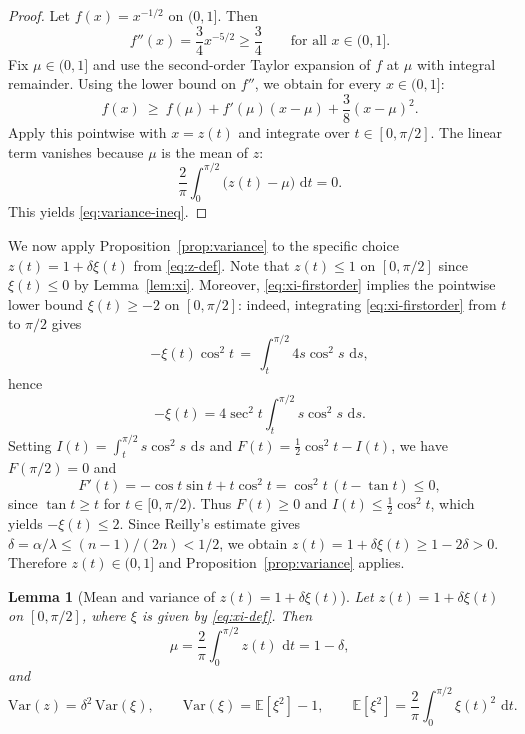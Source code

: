 \documentclass[11pt]{article}
\newtheorem{lemma}[theorem]{Lemma}
\newcommand{\E}{\mathbb{E}}
\newcommand{\Var}{\mathrm{Var}}
\newcommand{\dd}{\,\mathrm{d}}
\begin{document}
\begin{proof}
Let $f(x)=x^{-1/2}$ on $(0,1]$.
Then
\begin{equation}
f''(x)=\frac{3}{4}x^{-5/2}\ge \frac{3}{4}
\qquad \text{for all }x\in(0,1].
\end{equation}
Fix $\mu\in(0,1]$ and use the second-order Taylor expansion of $f$ at $\mu$ with integral remainder.
Using the lower bound on $f''$, we obtain for every $x\in(0,1]$:
\begin{equation}
f(x)\ \ge\ f(\mu)+f'(\mu)(x-\mu)+\frac{3}{8}(x-\mu)^2.
\end{equation}
Apply this pointwise with $x=z(t)$ and integrate over $t\in[0,\pi/2]$.
The linear term vanishes because $\mu$ is the mean of $z$:
\begin{equation}
\frac{2}{\pi}\int_{0}^{\pi/2}\bigl(z(t)-\mu\bigr)\,\dd t = 0.
\end{equation}
This yields \eqref{eq:variance-ineq}.
\end{proof}

We now apply Proposition~\ref{prop:variance} to the specific choice $z(t)=1+\delta\xi(t)$ from \eqref{eq:z-def}.
Note that $z(t)\le 1$ on $[0,\pi/2]$ since $\xi(t)\le 0$ by Lemma~\ref{lem:xi}.
Moreover, \eqref{eq:xi-firstorder} implies the pointwise lower bound $\xi(t)\ge -2$ on $[0,\pi/2]$: indeed, integrating \eqref{eq:xi-firstorder} from $t$ to $\pi/2$ gives
\[
-\xi(t)\cos^2 t\,=\,\int_t^{\pi/2}4s\cos^2 s\,\dd s,
\]
hence
\[
-\xi(t)=4\sec^2 t\int_t^{\pi/2}s\cos^2 s\,\dd s.
\]
Setting $I(t)=\int_t^{\pi/2}s\cos^2 s\,\dd s$ and $F(t)=\tfrac12\cos^2 t-I(t)$, we have $F(\pi/2)=0$ and
\[
F'(t)=-\cos t\sin t+t\cos^2 t=\cos^2 t\,(t-\tan t)\le 0,
\]
since $\tan t\ge t$ for $t\in[0,\pi/2)$.
Thus $F(t)\ge 0$ and $I(t)\le \tfrac12\cos^2 t$, which yields $-\xi(t)\le 2$.
Since Reilly's estimate gives $\delta=\alpha/\lambda\le (n-1)/(2n)<1/2$, we obtain $z(t)=1+\delta\xi(t)\ge 1-2\delta>0$.
Therefore $z(t)\in(0,1]$ and Proposition~\ref{prop:variance} applies.

\begin{lemma}[Mean and variance of $z(t)=1+\delta\xi(t)$]
\label{lem:meanvar-z}
Let $z(t)=1+\delta\xi(t)$ on $[0,\pi/2]$, where $\xi$ is given by \eqref{eq:xi-def}.
Then
\begin{equation}
\label{eq:mu-1-delta}
\mu = \frac{2}{\pi}\int_0^{\pi/2} z(t)\,\dd t = 1-\delta,
\end{equation}
and
\begin{equation}
\label{eq:var-z}
\Var(z)=\delta^2\,\Var(\xi),
\qquad
\Var(\xi)=\E[\xi^2]-1,
\qquad
\E[\xi^2]=\frac{2}{\pi}\int_0^{\pi/2}\xi(t)^2\,\dd t.
\end{equation}
\end{lemma}
\end{document}
